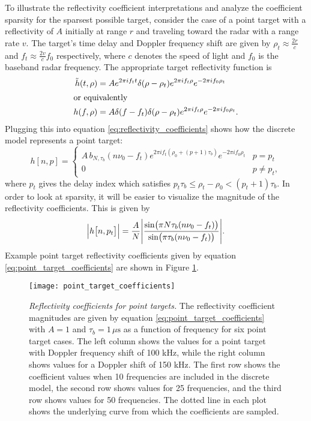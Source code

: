 To illustrate the reflectivity coefficient interpretations and analyze the coefficient sparsity for the sparsest possible target, consider the case of a point target with a reflectivity of $A$ initially at range $r$ and traveling toward the radar with a range rate $v$. The target's time delay and Doppler frequency shift are given by $\rho_t \approx \frac{2r}{c}$ and $f_t \approx \frac{2v}{c}f_0$ respectively, where $c$ denotes the speed of light and $f_0$ is the baseband radar frequency. The appropriate target reflectivity function is
\begin{align}
 \tilde{h}(t, \rho) &= A e^{2\pi i f_t t} \delta(\rho - \rho_t) e^{2\pi i f_t \rho} e^{-2\pi i f_0 \rho_t}\\
\intertext{or equivalently}
 h(f, \rho) &= A \delta(f - f_t) \delta(\rho - \rho_t) e^{2\pi i f_t \rho} e^{-2\pi i f_0 \rho_t}.
\end{align}
Plugging this into equation \eqref{eq:reflectivity_coefficients} shows how the discrete model represents a point target:
\begin{equation}
 h[n,p] = \begin{cases}
            A\, b_{N,\tau_b}(n\nu_0 - f_t) e^{2\pi i f_t(\rho_0 + (p+1)\tau_b)} e^{-2\pi i f_0 \rho_t} & p = p_t\\
            0 & p \neq p_t,
           \end{cases}
\end{equation}
where $p_t$ gives the delay index which satisfies $p_t\tau_b \leq \rho_t - \rho_0 < (p_t+1)\tau_b$. In order to look at sparsity, it will be easier to visualize the magnitude of the reflectivity coefficients. This is given by
\begin{equation}\label{eq:point_target_coefficients}
 \abs[\Big]{h\brak[\big]{n,p_t}} = \frac{A}{N} \abs*{\frac{\sin\paren[\big]{\pi N\tau_b (n\nu_0 - f_t)}}{\sin\paren[\big]{\pi\tau_b (n\nu_0 - f_t)}}}.
\end{equation}
Example point target reflectivity coefficients given by equation \eqref{eq:point_target_coefficients} are shown in Figure \ref{fig:point_target_coefficients}.
\begin{figure}[tpb]
 \centering
 \texttt{[image: point\_target\_coefficients]}
 \caption[Reflectivity coefficients for point targets]{\emph{Reflectivity coefficients for point targets.} The reflectivity coefficient magnitudes are given by equation \eqref{eq:point_target_coefficients} with $A = 1$ and $\tau_b = 1 \, \mu\textrm{s}$ as a function of frequency for six point target cases. The left column shows the values for a point target with Doppler frequency shift of 100 kHz, while the right column shows values for a Doppler shift of 150 kHz. The first row shows the coefficient values when 10 frequencies are included in the discrete model, the second row shows values for 25 frequencies, and the third row shows values for 50 frequencies. The dotted line in each plot shows the underlying curve from which the coefficients are sampled.}
 \label{fig:point_target_coefficients}
\end{figure}%
